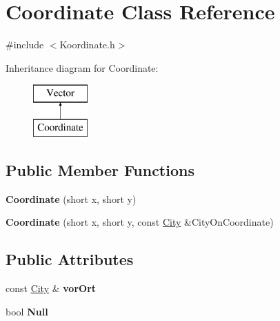 \hypertarget{class_coordinate}{\section{Coordinate Class Reference}
\label{class_coordinate}
}


{\ttfamily \#include $<$Koordinate.\-h$>$}

Inheritance diagram for Coordinate\-:\begin{figure}[H]
\begin{center}
\leavevmode
\includegraphics[height=2.000000cm]{class_coordinate}
\end{center}
\end{figure}
\subsection*{Public Member Functions}
\begin{DoxyCompactItemize}
\item 
\hypertarget{class_coordinate_afa539ca7218f25717e25482babf0bfc9}{{\bfseries Coordinate} (short x, short y)}\label{class_coordinate_afa539ca7218f25717e25482babf0bfc9}

\item 
\hypertarget{class_coordinate_a6f212c6c04f0f87e09157cff2092c111}{{\bfseries Coordinate} (short x, short y, const \hyperlink{class_city}{City} \&City\-On\-Coordinate)}\label{class_coordinate_a6f212c6c04f0f87e09157cff2092c111}

\end{DoxyCompactItemize}
\subsection*{Public Attributes}
\begin{DoxyCompactItemize}
\item 
\hypertarget{class_coordinate_a68372ad69c745041d63625c2a9ed4577}{const \hyperlink{class_city}{City} \& {\bfseries vor\-Ort}}\label{class_coordinate_a68372ad69c745041d63625c2a9ed4577}

\item 
\hypertarget{class_coordinate_ac7c3032bcd943e1e0d3576d6ec39745a}{bool {\bfseries Null}}\label{class_coordinate_ac7c3032bcd943e1e0d3576d6ec39745a}

\end{DoxyCompactItemize}


